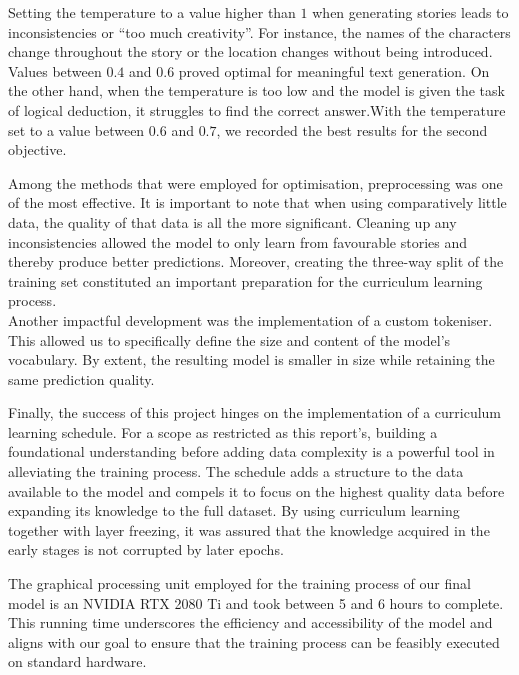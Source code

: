 \documentclass[11pt]{article}
\begin{document}
    Setting the temperature to a value higher than $1$ when generating stories leads to inconsistencies or “too much creativity”.
    For instance, the names of the characters change throughout the story or the location changes without being introduced.\footnotemark[\value{footnote}]
    Values between $0.4$ and $0.6$ proved optimal for meaningful text generation.
    On the other hand, when the temperature is too low and the model is given the task of logical deduction, it struggles to find the correct answer.\footnotemark[\value{footnote}]
    With the temperature set to a value between $0.6$ and $0.7$, we recorded the best results for the second objective.

    Among the methods that were employed for optimisation, preprocessing was one of the most effective. It is important to note that when using comparatively little data, the quality of that data is all the more significant. Cleaning up any inconsistencies allowed the model to only learn from favourable stories and thereby produce better predictions.
    Moreover, creating the three-way split of the training set constituted an important preparation for the curriculum learning process.\\

    Another impactful development was the implementation of a custom tokeniser. This allowed us to specifically define the size and content of the model's vocabulary. By extent, the resulting model is smaller in size while retaining the same prediction quality.

    Finally, the success of this project hinges on the implementation of a curriculum learning schedule. For a scope as restricted as this report's, building a foundational understanding before adding data complexity is a powerful tool in alleviating the training process.
    The schedule adds a structure to the data available to the model and compels it to focus on the highest quality data before expanding its knowledge to the full dataset.
    By using curriculum learning together with layer freezing, it was assured that the knowledge acquired in the early stages is not corrupted by later epochs.

    The graphical processing unit employed for the training process of our final model is an NVIDIA RTX 2080 Ti and took between 5 and 6 hours to complete.
    This running time underscores the efficiency and accessibility of the model and aligns with our goal to ensure that the training process can be feasibly executed on standard hardware.
\end{document}
